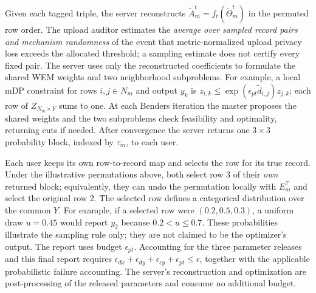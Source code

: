 Given each tagged triple, the server reconstructs
$\widetilde A_m^t=f_t(\widetilde\Theta_m^t)$ in the permuted row
order. The upload auditor estimates the \emph{average over sampled
record pairs and mechanism randomness} of the event that
metric-normalized upload privacy loss exceeds the allocated
threshold; a sampling estimate does not certify every fixed pair.
The server uses only the reconstructed coefficients to formulate the
shared WEM weights and two neighborhood subproblems. For example,
a local mDP constraint for rows $i,j\in N_m$ and output $y_k$ is
$z_{i,k}\leq\exp(\epsilon_{pt}\widetilde d_{i,j})z_{j,k}$;
each row of $Z_{N_m\times Y}$ sums to one. At each Benders
iteration the master proposes the shared weights and the two
subproblems check feasibility and optimality, returning cuts if
needed. After convergence the server returns one $3\times3$
probability block, indexed by $\tau_m$, to each user.

Each user keeps its own row-to-record map and selects the row for
its true record. Under the illustrative permutations above, both
select row 3 of their \emph{own} returned block; equivalently, they
can undo the permutation locally with $E_m^\top$ and select the
original row 2. The selected row defines a categorical
distribution over the common $Y$. For example, if a selected row
were $(0.2,0.5,0.3)$, a uniform draw $u=0.45$ would report $y_2$
because $0.2<u\leq0.7$. These probabilities illustrate the sampling
rule only; they are not claimed to be the optimizer's output.
The report uses budget $\epsilon_{pt}$. Accounting for the three
parameter releases and this final report requires
$\epsilon_{dx}+\epsilon_{dy}+\epsilon_{cy}+\epsilon_{pt}
\leq\epsilon$, together with the applicable probabilistic
failure accounting. The server's reconstruction and optimization
are post-processing of the released parameters and consume no
additional budget.
